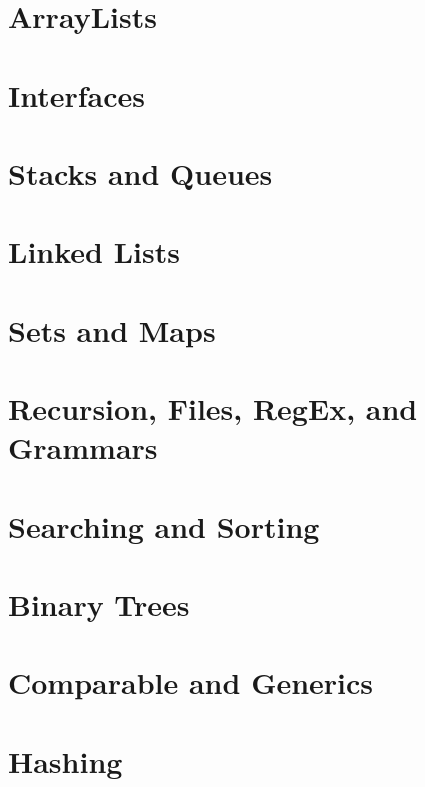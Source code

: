 \section{ArrayLists}
\section{Interfaces}
\section{Stacks and Queues}
\section{Linked Lists}
\section{Sets and Maps}
\section{Recursion, Files, RegEx, and Grammars}
\section{Searching and Sorting}
\section{Binary Trees}
\section{Comparable and Generics}
\section{Hashing}